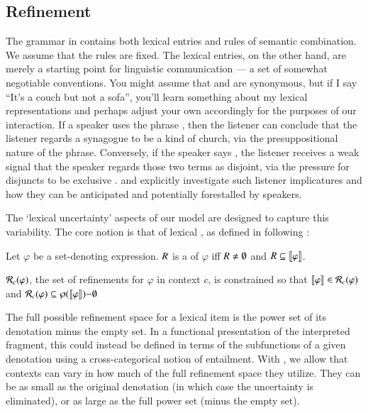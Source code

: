 \documentclass[leqno,12pt]{article}
\begin{document}

\subsection{Refinement}\label{sec:refine}


The grammar in  contains both lexical entries and
rules of semantic combination. We assume that the rules are fixed.
The lexical entries, on the other hand, are merely a starting point
for linguistic communication --- a set of somewhat negotiable
conventions. You might assume that  and  are
synonymous, but if I say ``It's a couch but not a sofa'', you'll learn
something about my lexical representations and perhaps adjust your own
accordingly for the purposes of our interaction.  If a speaker uses
the phrase , then the listener can
conclude that the listener regards a synagogue to be a kind of church,
via the presuppositional nature of the phrase. Conversely, if the
speaker says , the listener receives a weak
signal that the speaker regards those two terms as disjoint, via the
pressure for disjuncts to be exclusive
\citep{Hurford:1974}. \citet{Chemla-HurfordCounts} and
\citet{Potts:Levy:2015} explicitly investigate such listener
implicatures and how they can be anticipated and potentially
forestalled by speakers.

The `lexical uncertainty' aspects of our model are designed to capture
this variability. The core notion is that of lexical
, as defined in  following \citet{Bergen:Levy:Goodman:2014}:
%
\begin{examples}
\item\label{refinement} 
  \begin{examples}
  \item Let $\varphi$ be a set-denoting expression. $R$ is a
     of $\varphi$ iff $R \neq \emptyset$ and
    $R \subseteq \llbracket\varphi\rrbracket$.
  \item\label{refine} $\mathcal{R}_{c}(\varphi)$, the set of refinements for
    $\varphi$ in context $c$, is constrained so that
    $\llbracket\varphi\rrbracket \in \mathcal{R}_{c}(\varphi)$ and
    $\mathcal{R}_{c}(\varphi) \subseteq \wp(\llbracket\varphi\rrbracket){-}\emptyset$
  \end{examples}
\end{examples}
%
The full possible refinement space for a lexical item is the power set
of its denotation minus the empty set. In a functional presentation of
the interpreted fragment, this could instead be defined in terms of
the subfunctions of a given denotation using a cross-categorical
notion of entailment. With , we allow that
contexts can vary in how much of the full refinement space they
utilize. They can be as small as the original denotation (in which
case the uncertainty is eliminated), or as large as the full power set
(minus the empty set).
\end{document}
